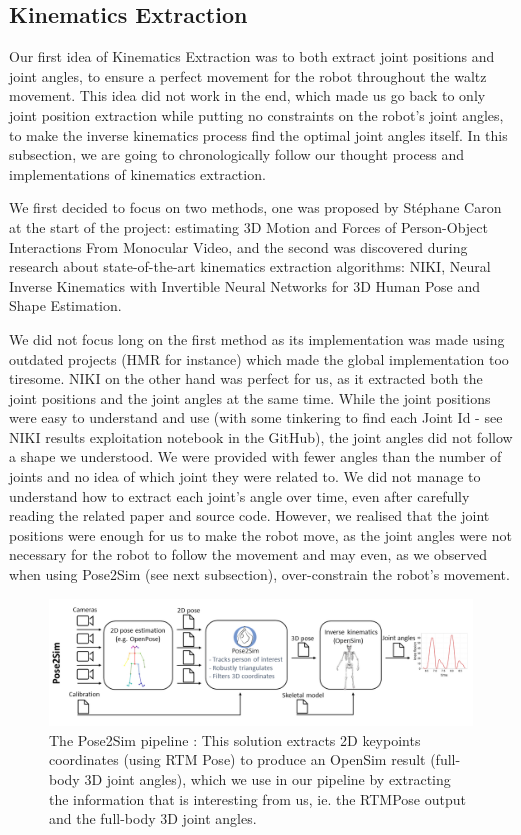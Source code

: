 \documentclass{amsart}
\theoremstyle{definition}
\theoremstyle{plain}
\begin{document}
\subsection{Kinematics Extraction}
Our first idea of Kinematics Extraction was to both extract joint positions and joint angles, to ensure a perfect movement for the robot throughout the waltz movement. 
This idea did not work in the end, which made us go back to only joint position extraction while putting no constraints on the robot's joint angles, to make the inverse kinematics process find the optimal joint angles itself. 
In this subsection, we are going to chronologically follow our thought process and implementations of kinematics extraction.

We first decided to focus on two methods, one was proposed by Stéphane Caron at the start of the project: 
estimating 3D Motion and Forces of Person-Object Interactions From Monocular Video\cite{Li_2019}, and the second was discovered during research about state-of-the-art kinematics extraction algorithms: 
NIKI, Neural Inverse Kinematics with Invertible Neural Networks for 3D Human Pose and Shape Estimation\cite{li2023niki}.

We did not focus long on the first method as its implementation was made using outdated projects (HMR for instance) which made the global implementation too tiresome. 
NIKI on the other hand was perfect for us, as it extracted both the joint positions and the joint angles at the same time. 
While the joint positions were easy to understand and use (with some tinkering to find each Joint Id - see NIKI results exploitation notebook in the GitHub), the joint angles did not follow a shape we understood. 
We were provided with fewer angles than the number of joints and no idea of which joint they were related to. 
We did not manage to understand how to extract each joint's angle over time, even after carefully reading the related paper and source code.
However, we realised that the joint positions were enough for us to make the robot move, as the joint angles were not necessary for the robot to follow the movement and may even, 
as we observed when using Pose2Sim (see next subsection), over-constrain the robot's movement.

\begin{figure}
  \includegraphics[width = 0.99 \columnwidth]{img/pose2sim_pipeline.png}
  \caption{The Pose2Sim pipeline : This solution extracts 2D keypoints coordinates (using RTM Pose\cite{RTMPose}) to produce an OpenSim result (full-body 3D joint angles), which we use in our pipeline by extracting the information that is interesting from us, ie. the RTMPose output and the full-body 3D joint angles.}
  \label{fig:pose2sim_pipeline}
\end{figure}
\end{document}

